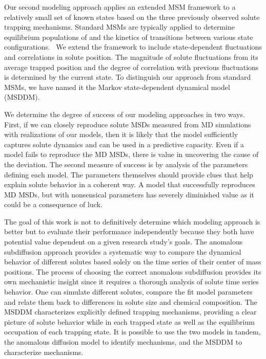 \documentclass[12pt]{article}
\begin{document}
  Our second modeling approach applies an extended MSM framework to a relatively 
  small set of known states based on the three previously observed solute trapping mechanisms.  
  Standard MSMs are typically applied to determine equilibrium populations
  of and the kinetics of transitions between various state configurations.~\cite{bowman_using_2009} 
  We extend the framework to include state-dependent fluctuations and correlations in 
  solute position. The magnitude of solute fluctuations from its average trapped 
  position and the degree of correlation with previous fluctuations is 
  determined by the current state. To distinguish our approach from standard MSMs, we have
  named it the Markov state-dependent dynamical model (MSDDM).
  
  We determine the degree of success of our modeling approaches in two ways. First,
  if we can closely reproduce solute MSDs measured from MD simulations with realizations
  of our models, then it is likely that the model sufficiently captures solute 
  dynamics and can be used in a predictive capacity. Even if a model fails to 
  reproduce the MD MSDs, there is value in uncovering the cause of the deviation.
  The second measure of success is by analysis of the parameters defining each 
  model. The parameters themselves should provide clues that help explain solute 
  behavior in a coherent way. A model that successfully reproduces MD MSDs, but 
  with nonsensical parameters has severely diminished value as it could be a 
  consequence of luck.
  
  The goal of this work is not to definitively determine which modeling approach
  is better but to evaluate their performance independently because they both
  have potential value dependent on a given research study's goals. The anomalous subdiffusion
  approach provides a systematic way to compare the dynamical behavior of different
  solutes based solely on the time series of their center of mass positions. The process
  of choosing the correct anomalous subdiffusion provides its own mechanistic insight
  since it requires a thorough analysis of solute time series behavior. One can simulate
  different solutes, compare the fit model parameters and relate them back to 
  differences in solute size and chemical composition. The MSDDM characterizes 
  explicitly defined trapping mechanisms, providing a clear picture of solute behavior
  while in each trapped state as well as the equilibrium occupation of each trapping state.
  It is possible to use the two models in tandem, the anomalous diffusion model to
  identify mechanisms, and the MSDDM to characterize mechanisms. 
  
\end{document}

